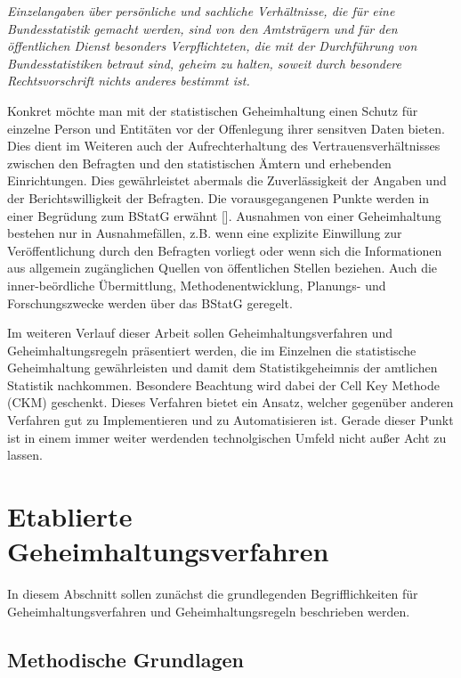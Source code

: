 \textit{\glqq Einzelangaben über persönliche und sachliche Verhältnisse, die für eine Bundesstatistik gemacht werden, sind von den Amtsträgern und für den öffentlichen Dienst besonders Verpflichteten, die mit der Durchführung von Bundesstatistiken betraut sind, geheim zu halten, soweit durch besondere Rechtsvorschrift nichts anderes bestimmt ist.\grqq{}}

Konkret möchte man mit der statistischen Geheimhaltung einen Schutz für einzelne Person und Entitäten vor der Offenlegung ihrer sensitven Daten bieten. Dies dient im Weiteren auch der Aufrechterhaltung des Vertrauensverhältnisses zwischen den Befragten und den statistischen Ämtern und erhebenden Einrichtungen. Dies gewährleistet abermals die Zuverlässigkeit der Angaben und der Berichtswilligkeit der Befragten. Die vorausgegangenen Punkte werden in einer Begrüdung zum BStatG erwähnt [\cite{Nickl}]. Ausnahmen von einer Geheimhaltung bestehen nur in Ausnahmefällen, z.B. wenn eine explizite Einwillung zur Veröffentlichung durch den Befragten vorliegt oder wenn sich die Informationen aus allgemein zugänglichen Quellen von öffentlichen Stellen beziehen. Auch die inner-beördliche Übermittlung, Methodenentwicklung, Planungs- und Forschungszwecke werden über das BStatG geregelt.

Im weiteren Verlauf dieser Arbeit sollen Geheimhaltungsverfahren und Geheimhaltungsregeln präsentiert werden, die im Einzelnen die statistische Geheimhaltung gewährleisten und damit dem Statistikgeheimnis der amtlichen Statistik nachkommen. Besondere Beachtung wird dabei der Cell Key Methode (CKM) geschenkt. Dieses Verfahren bietet ein Ansatz, welcher gegenüber anderen Verfahren gut zu Implementieren und zu Automatisieren ist. Gerade dieser Punkt ist in einem immer weiter werdenden technolgischen Umfeld nicht außer Acht zu lassen.


\section{Etablierte Geheimhaltungsverfahren}

In diesem Abschnitt sollen zunächst die grundlegenden Begrifflichkeiten für Geheimhaltungsverfahren und Geheimhaltungsregeln beschrieben werden. 

\subsection{Methodische Grundlagen}

